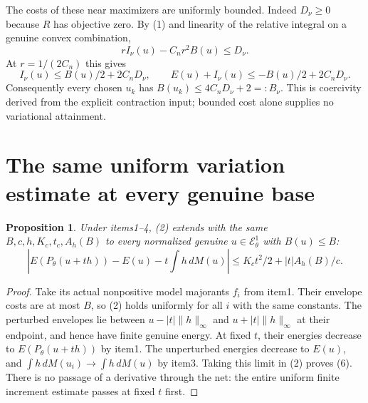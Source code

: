 \documentclass[11pt]{article}
\newtheorem{proposition}[theorem]{Proposition}
\newcommand{\EE}{\mathcal E^1_\theta}
\begin{document}
The costs of these near maximizers are uniformly bounded. Indeed
$D_\nu\geq0$ because $R$ has objective zero. By (1) and linearity
of the relative integral on a genuine convex combination,
\[
 r I_\nu(u)-C_nr^2B(u)\leq D_\nu.
\]
At $r=1/(2C_n)$ this gives
\[
 I_\nu(u)\leq B(u)/2+2C_nD_\nu,\qquad
 E(u)+I_\nu(u)\leq-B(u)/2+2C_nD_\nu.                      \tag{5}
\]
Consequently every chosen $u_k$ has
$B(u_k)\leq4C_nD_\nu+2=:B_\nu$.
This is coercivity derived from the explicit contraction input;
bounded cost alone supplies no variational attainment.

\section{The same uniform variation estimate at every genuine base}
\begin{proposition}\label{variation}
Under items1--4, (2) extends with the same $B,c,h,K_c,t_c,A_h(B)$
to every normalized genuine $u\in\EE$ with $B(u)\leq B$:
\[
 \left|E(P_\theta(u+th))-E(u)-t\int h\,dM(u)\right|
 \leq K_ct^2/2+|t|A_h(B)/c.                                \tag{6}
\]
\end{proposition}
\begin{proof}
Take its actual nonpositive model majorants $f_i$ from item1.
Their envelope costs are at most $B$, so (2) holds uniformly for
all $i$ with the same constants. The perturbed envelopes lie between
$u-|t|\|h\|_\infty$ and $u+|t|\|h\|_\infty$ at their endpoint,
and hence have finite genuine energy. At fixed $t$, their energies
decrease to $E(P_\theta(u+th))$ by item1. The unperturbed energies
decrease to $E(u)$, and $\int h\,dM(u_i)\to\int h\,dM(u)$
by item3. Taking this limit in (2) proves (6).
There is no passage of a derivative through the net: the entire
uniform finite increment estimate passes at fixed $t$ first.
\end{proof}
\end{document}
